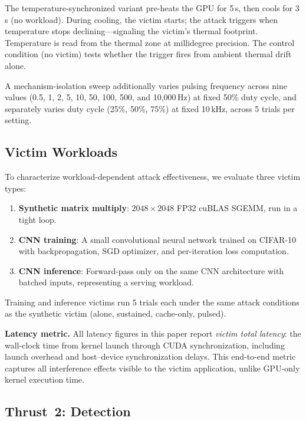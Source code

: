 \documentclass[conference]{IEEEtran}
\begin{document}
The temperature-synchronized variant pre-heats the GPU for 5\,s, then
cools for 3\,s (no workload).  During cooling, the victim starts;
the attack triggers when temperature stops declining---signaling the
victim's thermal footprint.  Temperature is read from the thermal zone
at millidegree precision.  The control condition (no victim) tests
whether the trigger fires from ambient thermal drift alone.

A mechanism-isolation sweep additionally varies pulsing frequency
across nine values (0.5, 1, 2, 5, 10, 50, 100, 500, and
10{,}000\,Hz) at fixed 50\% duty cycle, and separately varies
duty cycle (25\%, 50\%, 75\%) at fixed 10\,kHz, across 5 trials
per setting.

\subsection{Victim Workloads}

To characterize workload-dependent attack effectiveness, we evaluate
three victim types:

\begin{enumerate}
\item \textbf{Synthetic matrix multiply}: $2048 \times 2048$ FP32
  cuBLAS SGEMM, run in a tight loop.
\item \textbf{CNN training}: A small convolutional neural network
  trained on CIFAR-10 with backpropagation, SGD optimizer, and
  per-iteration loss computation.
\item \textbf{CNN inference}: Forward-pass only on the same CNN
  architecture with batched inputs, representing a serving workload.
\end{enumerate}

Training and inference victims run 5 trials each under the same
attack conditions as the synthetic victim (alone, sustained,
cache-only, pulsed).

\textbf{Latency metric.}  All latency figures in this paper report
\emph{victim total latency}: the wall-clock time from kernel launch
through CUDA synchronization, including launch overhead and
host--device synchronization delays.  This end-to-end metric captures
all interference effects visible to the victim application, unlike
GPU-only kernel execution time.

\subsection{Thrust~2: Detection}
\end{document}
